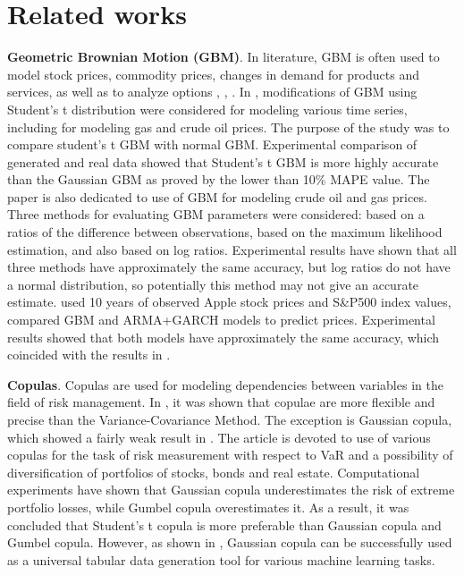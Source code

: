 \documentclass{article}
\begin{document}
\section{Related works}
\label{section:related}
\textbf{Geometric Brownian Motion (GBM)}. In literature, GBM is often used to model stock prices, commodity prices, changes in demand for products and services, as well as to analyze options \cite{BENNINGA}, \cite{Nembhard}, \cite{Thorsen}. In \cite{Nkemnole}, modifications of GBM using Student's t distribution were considered for modeling various time series, including for modeling gas and crude oil prices. The purpose of the study was to compare student's t GBM with normal GBM. Experimental comparison of generated and real data showed that Student's t GBM is more highly accurate than the Gaussian GBM as proved by the lower than 10\% MAPE value. The paper \cite{Croghan2017EstimationOG} is also dedicated to use of GBM for modeling crude oil and gas prices. Three methods for evaluating GBM parameters were considered: based on a ratios of the difference between observations, based on the maximum likelihood estimation, and also based on log ratios. Experimental results have shown that all three methods have approximately the same accuracy, but log ratios do not have a normal distribution, so potentially this method may not give an accurate estimate. \cite{Lidn2018StockPP} used 10 years of observed Apple stock prices and S\&P500 index values, compared GBM and ARMA+GARCH models to predict prices. Experimental results showed that both models have approximately the same accuracy, which coincided with the results in \cite{Reddy}.

\textbf{Copulas}. Copulas are used for modeling dependencies between variables in the field of risk management. In \cite{Stefano2005}, it was shown that copulae are more flexible and precise than the Variance-Covariance Method. The exception is Gaussian copula, which showed a fairly weak result in \cite{Thorsen}. The article \cite{Kole2006} is devoted to use of various copulas for the task of risk measurement with respect to VaR and a possibility of diversification of portfolios of stocks, bonds and real estate. Computational experiments have shown that Gaussian copula underestimates the risk of extreme portfolio losses, while Gumbel copula overestimates it. As a result, it was concluded that Student's t copula is more preferable than Gaussian copula and Gumbel copula. However, as shown in \cite{Patki2016}, Gaussian copula can be successfully used as a universal tabular data generation tool for various machine learning tasks.
\end{document}
